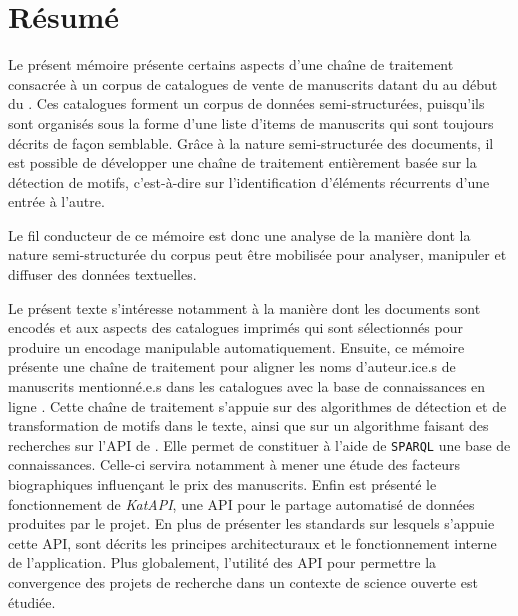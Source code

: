 
\frontmatter
\chapter*{Résumé}
Le présent mémoire présente certains aspects d'une chaîne de traitement consacrée à un corpus de catalogues de vente de manuscrits datant du  au début du . Ces catalogues forment un corpus de données semi-structurées, puisqu'ils sont organisés sous la forme d'une liste d'items de manuscrits qui sont toujours décrits de façon semblable. Grâce à la nature semi-structurée des documents, il est possible de développer une chaîne de traitement entièrement basée sur la détection de motifs, c'est-à-dire sur l'identification d'éléments récurrents d'une entrée à l'autre. 

Le fil conducteur de ce mémoire est donc une analyse de la manière dont la nature semi-structurée du corpus peut être mobilisée pour analyser, manipuler et diffuser des données textuelles.

Le présent texte s'intéresse notamment à la manière dont les documents sont encodés et aux aspects des catalogues imprimés qui sont sélectionnés pour produire un encodage manipulable automatiquement. Ensuite, ce mémoire présente une chaîne de traitement pour aligner les noms d'auteur.ice.s de manuscrits mentionné.e.s dans les catalogues avec la base de connaissances en ligne \wkd{}. Cette chaîne de traitement s'appuie sur des algorithmes de détection et de transformation de motifs dans le texte, ainsi que sur un algorithme faisant des recherches sur l'API de \wkd{}. Elle permet de constituer à l'aide de \texttt{SPARQL} une base de connaissances. Celle-ci servira notamment à mener une étude des facteurs biographiques influençant le prix des manuscrits. Enfin est présenté le fonctionnement de \textit{KatAPI}, une API pour le partage automatisé de données produites par le projet. En plus de présenter les standards sur lesquels s'appuie cette API, sont décrits les principes architecturaux et le fonctionnement interne de l'application. Plus globalement, l'utilité des API pour permettre la convergence des projets de recherche dans un contexte de science ouverte est étudiée.

\vfill

